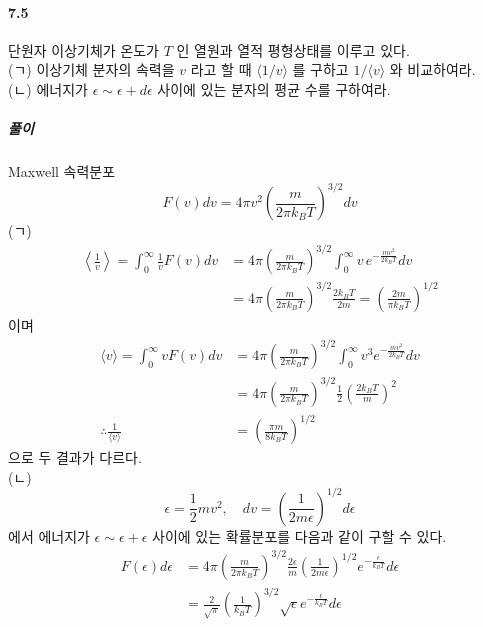 \documentclass[a4paper,12pt]{report}
\begin{document}
	\paragraph{7.5 } 단원자 이상기체가 온도가 $T$ 인 열원과 열적 평형상태를 이루고 있다. \\
	(ㄱ) 이상기체 분자의 속력을 $v$ 라고 할 때 $\langle 1/v \rangle$ 를 구하고 $1/\langle v\rangle$ 와 비교하여라.\\
	(ㄴ) 에너지가 $\epsilon\sim\epsilon+d\epsilon$ 사이에 있는 분자의 평균 수를 구하여라.
	\subparagraph{풀이} Maxwell 속력분포
	$$F(v)dv=4\pi v^2\left(\frac{m}{2\pi k_B T} \right)^{3/2}dv $$
	(ㄱ) 
	\begin{equation*}
		\begin{split}
		\left\langle \frac{1}{v} \right\rangle =\int_{0}^{\infty} \frac{1}{v}F(v)dv&=4\pi\left(\frac{m}{2\pi k_BT} \right)^{3/2} \int_{0}^{\infty} v\,e^{-\frac{mv^2}{2k_BT}}dv\\
		&=4\pi\left(\frac{m}{2\pi k_BT} \right)^{3/2}\frac{2k_BT}{2m}=\left(\frac{2m}{\pi k_B T} \right)^{1/2} 
		\end{split}
	\end{equation*}
	이며
	\begin{equation*}
		\begin{split}
		\langle v\rangle=\int_{0}^{\infty}vF(v)dv&=4\pi\left(\frac{m}{2\pi k_BT} \right)^{3/2}\int_{0}^{\infty}v^3e^{-\frac{mv^2}{2k_BT}}dv \\
		&=4\pi\left(\frac{m}{2\pi k_BT} \right)^{3/2}\frac{1}{2}\left(\frac{2k_BT}{m} \right)^2 \\
		\therefore \frac{1}{\langle v\rangle}&=\left(\frac{\pi m}{8k_BT} \right)^{1/2} 
		\end{split}
	\end{equation*}
	으로 두 결과가 다르다.\\
	(ㄴ) 
	$$\epsilon=\frac{1}{2}mv^2,\quad dv=\left(\frac{1}{2m\epsilon} \right)^{1/2}d\epsilon $$ 에서 에너지가 $\epsilon\sim\epsilon+\epsilon$ 사이에 있는 확률분포를 다음과 같이 구할 수 있다.
	\begin{equation*}
		\begin{split}
		F(\epsilon)d\epsilon&=4\pi\left(\frac{m}{2\pi k_BT} \right)^{3/2}\frac{2\epsilon}{m}\left(\frac{1}{2m\epsilon} \right)^{1/2}e^{-\frac{\epsilon}{k_BT}}d\epsilon  \\
		&=\frac{2}{\sqrt{\pi}}\left(\frac{1}{k_BT} \right)^{3/2}\sqrt{\epsilon}e^{-\frac{\epsilon}{k_BT}}d\epsilon 
		\end{split}
	\end{equation*}
\end{document}
